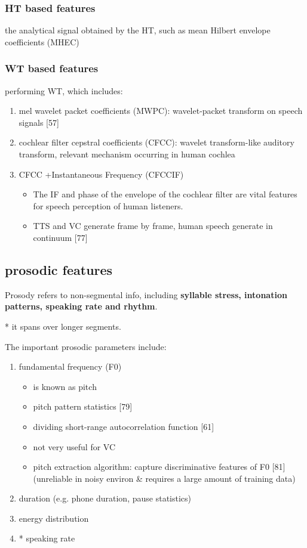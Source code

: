 \documentclass{article}
\begin{document}
\subsubsection{HT based features}
the analytical signal obtained by the HT, such as mean Hilbert envelope coefficients (MHEC)

\subsubsection{WT based features}
performing WT, which includes:

\begin{enumerate}
    \item mel wavelet packet coefficients (MWPC): wavelet-packet transform on speech signals [57]
    \item cochlear filter cepstral coefficients (CFCC): wavelet transform-like auditory transform, relevant mechanism occurring in human cochlea
    \item CFCC +Instantaneous Frequency (CFCCIF)
    \begin{itemize}
        \item The IF and phase of the envelope of the cochlear filter are vital features for speech perception of human listeners. 
        \item TTS and VC generate frame by frame, human speech generate in continuum [77]
    \end{itemize}
\end{enumerate}

\subsection{prosodic features}
Prosody refers to non-segmental info, including \textbf{syllable stress, intonation patterns, speaking rate and rhythm}. 

\vspace{5pt}
* it spans over longer segments. 

\vspace{5pt}
The important prosodic parameters include:

\begin{enumerate}
    \item fundamental frequency (F0)
        \begin{itemize}
            \item is known as pitch
            \item pitch pattern statistics [79]
            \item dividing short-range autocorrelation function [61]
            \item not very useful for VC
            \item pitch extraction algorithm: capture discriminative features of F0 [81] (unreliable in noisy environ \& requires a large amount of training data)      
        \end{itemize}
    \item duration (e.g. phone duration, pause statistics)
    \item energy distribution
    \item * speaking rate
\end{enumerate}
\end{document}
